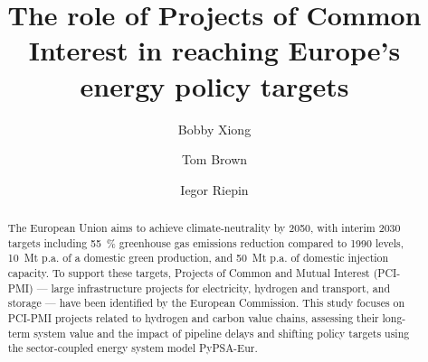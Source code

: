 \documentclass[preprint,12pt,sort&compress]{elsarticle}
\begin{document}
\begin{frontmatter}



\title{The role of Projects of Common Interest in reaching Europe's energy policy targets}


\author[affi1]{Bobby Xiong} %
\author[affil1]{Tom Brown}
\author[affil1]{Iegor Riepin}



\begin{abstract}
The European Union aims to achieve climate-neutrality by 2050, with interim 2030 targets including \SI{55}{\percent} greenhouse gas emissions reduction compared to 1990 levels, \SI{10}{Mt} p.a. of a domestic green  production, and \SI{50}{Mt} p.a. of domestic  injection capacity. To support these targets, Projects of Common and Mutual Interest (PCI-PMI) --- large infrastructure projects for electricity, hydrogen and  transport, and storage --- have been identified by the European Commission. This study focuses on PCI-PMI projects related to hydrogen and carbon value chains, assessing their long-term system value and the impact of pipeline delays and shifting policy targets using the sector-coupled energy system model PyPSA-Eur.


\end{abstract}
\end{frontmatter}
\end{document}
